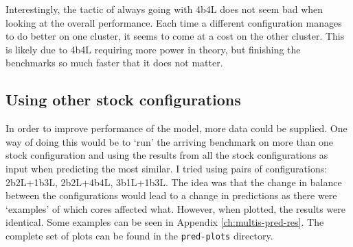     Interestingly, the tactic of always going with 4b4L does not seem bad when 
    looking at the overall performance. Each time a different configuration 
    manages to do better on one cluster, it seems to come at a cost on the 
    other cluster. This is likely due to 4b4L requiring more power in theory, 
    but finishing the benchmarks so much faster that it does not matter.
    
    \subsection{Using other stock configurations}
    In order to improve performance of the model, more data could be supplied. 
    One way of doing this would be to `run' the arriving benchmark on more than 
    one stock configuration and using the results from all the stock 
    configurations as input when predicting the most similar. I tried using 
    pairs of configurations: 2b2L+1b3L, 2b2L+4b4L, 3b1L+1b3L. The idea was that
    the change in balance between the configurations would lead to a change in 
    predictions as there were `examples' of which cores affected what. However, 
    when plotted, the results were identical. Some examples can be seen in 
    Appendix \ref{ch:multis-pred-res}. The complete set of plots can be found in
    the \texttt{pred-plots} directory.
